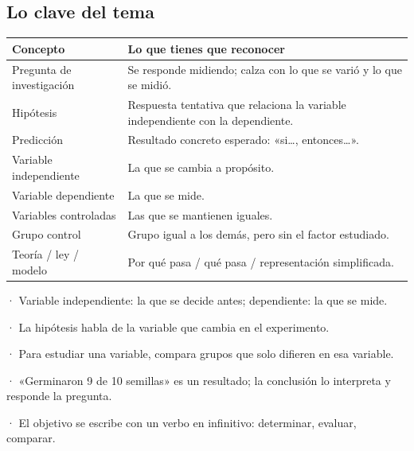 \subsection{Lo clave del tema}
\begin{center}\small
\begin{tabularx}{\linewidth}{@{}>{\raggedright\arraybackslash\hsize=0.77\hsize}X>{\raggedright\arraybackslash\hsize=1.23\hsize}X@{}}
\toprule
\textbf{Concepto} & \textbf{Lo que tienes que reconocer} \\
\midrule
Pregunta de investigación & Se responde midiendo; calza con lo que se varió y lo que se midió. \\
Hipótesis & Respuesta tentativa que relaciona la variable independiente con la dependiente. \\
Predicción & Resultado concreto esperado: «si\dots{}, entonces\dots{}». \\
Variable independiente & La que se cambia a propósito. \\
Variable dependiente & La que se mide. \\
Variables controladas & Las que se mantienen iguales. \\
Grupo control & Grupo igual a los demás, pero sin el factor estudiado. \\
Teoría / ley / modelo & Por qué pasa / qué pasa / representación simplificada. \\
\bottomrule
\end{tabularx}
\end{center}
 
\begin{clave}[{Recuerda}] · Variable independiente: la que se decide antes; dependiente: la que se mide.\par · La hipótesis habla de la variable que cambia en el experimento.\par · Para estudiar una variable, compara grupos que solo difieren en esa variable.\par · «Germinaron 9 de 10 semillas» es un resultado; la conclusión lo interpreta y responde la pregunta.\par · El objetivo se escribe con un verbo en infinitivo: determinar, evaluar, comparar.\end{clave}
 
